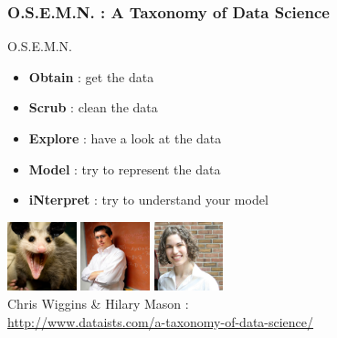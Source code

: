 \documentclass[xcolor=dvipsnames, 9pt]{beamer}
\begin{document}
\begin{frame}
    \frametitle{O.S.E.M.N. : A Taxonomy of Data Science}
    
    \begin{center}  
\begin{block}{O.S.E.M.N.}
        \begin{itemize}
            \item \textbf{Obtain} : get the data
            \item \textbf{Scrub} : clean the data
            \item \textbf{Explore} : have a look at the data
            \item \textbf{Model} : try to represent the data
            \item \textbf{iNterpret} : try to understand your model
        \end{itemize}
        \end{block}
        \vspace{2em}
        \includegraphics[width=0.15\textwidth]{possum.png}
        \hspace{1em}
        \includegraphics[width=0.15\textwidth]{chris.png}
        \hspace{1em}
        \includegraphics[width=0.15\textwidth]{hilary.png}\\
        Chris Wiggins \& Hilary Mason : \\ \url{http://www.dataists.com/a-taxonomy-of-data-science/}
    \end{center}
\end{frame}
\end{document}

